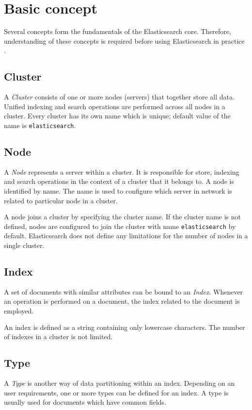 \documentclass[12pt,oneside]{fithesis2}
\begin{document}
\section{Basic concept}
Several concepts form the fundamentals of the Elasticsearch core. Therefore, understanding of these concepts is required before using Elasticsearch in practice \cite{elasticsearch_doc}.

\subsection{Cluster}
A \textit{Cluster} consists of one or more nodes (servers) that together store all data. Unified indexing and search operations are performed across all nodes in a cluster. Every cluster has its own name which is unique; default value of the name is \verb|elasticsearch|.

\subsection{Node}
A \textit{Node} represents a server within a cluster. It is responsible for store, indexing and search operations in the context of a cluster that it belongs to. A node is identified by name. The name is used to configure which server in network is related to particular node in a cluster.

A node joins a cluster by specifying the cluster name. If the cluster name is not defined, nodes are configured to join the cluster with name \verb|elasticsearch| by default. Elasticsearch does not define any limitations for the number of nodes in a single cluster.

\subsection{Index}
A set of documents with similar attributes can be bound to an \textit{Index}. Whenever an operation is performed on a document, the index related to the document is employed.

An index is defined as a string containing only lowercase characters. The number of indexes in a cluster is not limited.

\subsection{Type}
A \textit{Type} is another way of data partitioning within an index. Depending on an user requirements, one or more types can be defined for an index. A type is usually used for documents which have common fields.
\end{document}
